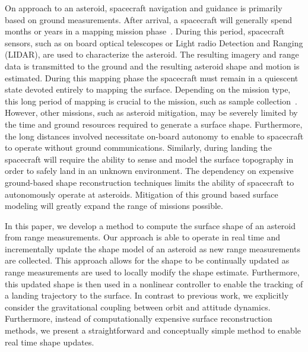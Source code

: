 \documentclass[journal]{new-aiaa}
\begin{document}
On approach to an asteroid, spacecraft navigation and guidance is primarily based on ground measurements.
After arrival, a spacecraft will generally spend months or years in a mapping mission phase~\cite{kubota2003,cole1998}.
During this period, spacecraft sensors, such as on board optical telescopes or Light radio Detection and Ranging (LIDAR), are used to characterize the asteroid.
The resulting imagery and range data is transmitted to the ground and the resulting asteroid shape and motion is estimated. 
During this mapping phase the spacecraft must remain in a quiescent state devoted entirely to mapping the surface.
Depending on the mission type, this long period of mapping is crucial to the mission, such as sample collection~\cite{gates2015}. 
However, other missions, such as asteroid mitigation, may be severely limited by the time and ground resources required to generate a surface shape.
Furthermore, the long distances involved necessitate on-board autonomy to enable to spacecraft to operate without ground communications.
Similarly, during landing the spacecraft will require the ability to sense and model the surface topography in order to safely land in an unknown environment.
The dependency on expensive ground-based shape reconstruction techniques limits the ability of spacecraft to autonomously operate at asteroids.
Mitigation of this ground based surface modeling will greatly expand the range of missions possible.

In this paper, we develop a method to compute the surface shape of an asteroid from range measurements.
Our approach is able to operate in real time and incrementally update the shape model of an asteroid as new range measurements are collected.
This approach allows for the shape to be continually updated as range measurements are used to locally modify the shape estimate.
Furthermore, this updated shape is then used in a nonlinear controller to enable the tracking of a landing trajectory to the surface.
In contrast to previous work, we explicitly consider the gravitational coupling between orbit and attitude dynamics.
Furthermore, instead of computationally expensive surface reconstruction methods, we present a straightforward and conceptually simple method to enable real time shape updates. 


\end{document}
